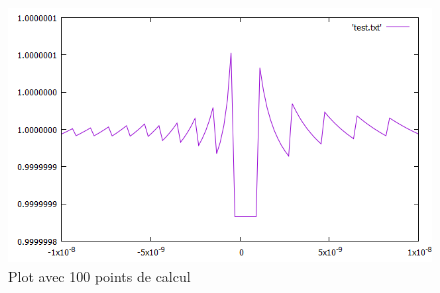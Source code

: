 \begin{figure}[H]
	\caption{\label{ex} Plot avec 100 points de calcul}
	\centering
	\includegraphics[scale = 0.61]{1_plot.png}
\end{figure}
